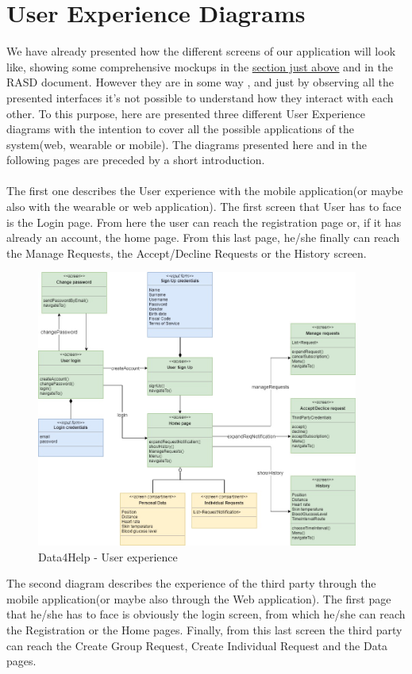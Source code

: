\section{User Experience Diagrams}
We have already presented how the different screens of our application will look like, showing some comprehensive mockups in the \hyperlink{MK}{\underline{section just above}} and in the RASD document. However they are in some way , and just by observing all the presented interfaces it's not possible to understand how they interact with each other.
To this purpose, here are presented three different User Experience diagrams with the intention to cover all the possible applications of the system(web, wearable or mobile).
The diagrams presented here and in the following pages are preceded by a short introduction.\\ \\
The first one describes the User experience with the mobile application(or maybe also with the wearable or web application). The first screen that User has to face is the Login page. From here the user can reach the registration page or, if it has already an account, the home page. From this last page, he/she finally can reach the Manage Requests, the Accept/Decline Requests or the History screen.
\begin{figure}[ht]
    \centering
    \includegraphics[width=300pt]{images/UX/UX_Diagram1.jpg}
    \caption{Data4Help - User experience}
    \label{UX1}
\end{figure}
\clearpage
The second diagram describes the experience of the third party through the mobile application(or maybe also through the Web application). The first page that he/she has to face is obviously the login screen, from which he/she can reach the Registration or the Home pages. Finally, from this last screen the third party can reach the Create Group Request, Create Individual Request and the Data pages.
